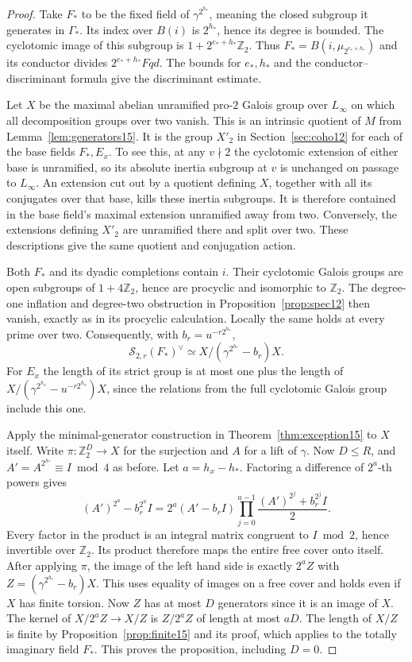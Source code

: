 \documentclass[a4paper,11pt]{article}
\theoremstyle{definition}
\theoremstyle{remark}
\newcommand{\ZZ}{\mathbb Z}\newcommand{\ord}{\operatorname{ord}}
\numberwithin{equation}{section}
\begin{document}
\begin{proof}
Take \(F_*\) to be the fixed field of \(\gamma^{2^{h_*}}\), meaning the closed subgroup it generates in \(\Gamma_*\). Its index over \(B(i)\) is \(2^{h_*}\), hence its degree is bounded. The cyclotomic image of this subgroup is \(1+2^{e_*+h_*}\ZZ_2\). Thus \(F_*=B(i,\mu_{2^{e_*+h_*}})\) and its conductor divides \(2^{e_*+h_*}Fqd\). The bounds for \(e_*,h_*\) and the conductor--discriminant formula give the discriminant estimate.

Let \(X\) be the maximal abelian unramified pro-\(2\) Galois group over \(L_\infty\) on which all decomposition groups over two vanish. This is an intrinsic quotient of \(M\) from Lemma~\ref{lem:generators15}. It is the group \(X'_2\) in Section~\ref{sec:coho12} for each of the base fields \(F_*,E_x\). To see this, at any \(v\nmid2\) the cyclotomic extension of either base is unramified, so its absolute inertia subgroup at \(v\) is unchanged on passage to \(L_\infty\). An extension cut out by a quotient defining \(X\), together with all its conjugates over that base, kills these inertia subgroups. It is therefore contained in the base field's maximal extension unramified away from two. Conversely, the extensions defining \(X'_2\) are unramified there and split over two. These descriptions give the same quotient and conjugation action.

Both \(F_*\) and its dyadic completions contain \(i\). Their cyclotomic Galois groups are open subgroups of \(1+4\ZZ_2\), hence are procyclic and isomorphic to \(\ZZ_2\). The degree-one inflation and degree-two obstruction in Proposition~\ref{prop:spec12} then vanish, exactly as in its procyclic calculation. Locally the same holds at every prime over two. Consequently, with \(b_r=u^{-r2^{h_*}}\),
\[
 \mathcal S_{2,r}(F_*)^\vee
             \simeq X/(\gamma^{2^{h_*}}-b_r)X .
\]
For \(E_x\) the length of its strict group is at most one plus the length of \(X/(\gamma^{2^{h_x}}-u^{-r2^{h_x}})X\), since the relations from the full cyclotomic Galois group include this one.

Apply the minimal-generator construction in Theorem~\ref{thm:exception15} to \(X\) itself. Write \(\pi:\ZZ_2^D\to X\) for the surjection and \(A\) for a lift of \(\gamma\). Now \(D\le R\), and \(A'=A^{2^{h_*}}\equiv I\bmod4\) as before. Let \(a=h_x-h_*\). Factoring a difference of \(2^a\)-th powers gives
\[
 (A')^{2^a}-b_r^{2^a}I
    =2^a(A'-b_r I)
       \prod_{j=0}^{a-1}\frac{(A')^{2^j}+b_r^{2^j}I}{2}.
\]
Every factor in the product is an integral matrix congruent to \(I\bmod2\), hence invertible over \(\ZZ_2\). Its product therefore maps the entire free cover onto itself. After applying \(\pi\), the image of the left hand side is exactly \(2^a Z\) with \(Z=(\gamma^{2^{h_*}}-b_r)X\). This uses equality of images on a free cover and holds even if \(X\) has finite torsion. Now \(Z\) has at most \(D\) generators since it is an image of \(X\). The kernel of \(X/2^aZ\to X/Z\) is \(Z/2^aZ\) of length at most \(aD\). The length of \(X/Z\) is finite by Proposition~\ref{prop:finite15} and its proof, which applies to the totally imaginary field \(F_*\). This proves the proposition, including \(D=0\).
\end{proof}
\end{document}
